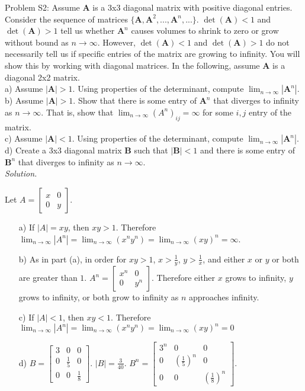 \documentclass[12pt,pdftex]{article}
\begin{document}
\noindent Problem S2: Assume $\mathbf{A}$ is a 3x3 diagonal matrix with positive diagonal entries.\\
Consider the sequence of matrices $\{\mathbf{A}, \mathbf{A}^2,...,\mathbf{A}^n,...\}$.  $\det(\mathbf{A})<1$ and $\det(\mathbf{A})>1$ tell us whether $\mathbf{A}^n$ causes volumes to shrink to zero or grow without bound as $n\rightarrow \infty$.  However, $\det(\mathbf{A})<1$ and $\det(\mathbf{A})>1$ do not necessarily tell us if specific entries of the matrix are growing to infinity.  You will show this by working with diagonal matrices. In the following, assume $\mathbf{A}$ is a diagonal 2x2 matrix.  \\
a) Assume $|\mathbf{A}|>1$.  Using properties of the determinant, compute $\lim_{n\rightarrow\infty}|\mathbf{A}^n|$. \\
b)   Assume $|\mathbf{A}|>1$. Show that there is some entry of $\mathbf{A}^n$ that diverges to infinity as $n\rightarrow\infty$.  That is, show that $\lim_{n\rightarrow \infty} (A^n)_{ij}=\infty$ for some $i,j$ entry of the matrix. \\
c) Assume $|\mathbf{A}|<1$.  Using properties of the determinant, compute $\lim_{n\rightarrow\infty}|\mathbf{A}^n|$. \\
d) Create a 3x3 diagonal matrix $\mathbf{B}$ such that $|\mathbf{B}|<1$ and there is some entry of $\mathbf{B}^n$ that diverges to infinity as $n\rightarrow\infty$.   \\
\textit{Solution.}\\
\begin{center}Let $A=\begin{bmatrix} x & 0 \\ 0 & y\end{bmatrix}$.\end{center}
\begin{itemize}
\item[a)] If $|A|=xy$, then $xy > 1$. Therefore $\lim_{n\rightarrow\infty}|A^n|=\lim_{n\rightarrow\infty}(x^ny^n)=\lim_{n\rightarrow\infty}(xy)^n=\infty$.
\item[b)] As in part (a), in order for $xy>1$, $x>\frac{1}{y}$, $y>\frac{1}{x}$, and either $x$ or $y$ or both are greater than $1$. 
$A^n=\begin{bmatrix}x^n & 0 \\ 0 & y^n\end{bmatrix}$. Therefore either $x$ grows to infinity, $y$ grows to infinity, or both grow to infinity as $n$ approaches infinity.
\item[c)] If $|A|<1$, then $xy<1$. Therefore $\lim_{n\rightarrow\infty}|A^n|=\lim_{n\rightarrow\infty}(x^ny^n)=\lim_{n\rightarrow\infty}(xy)^n=0$
\item[d)] $B=\begin{bmatrix}3&0&0\\0&\frac{1}{5}&0\\0&0&\frac{1}{8}\end{bmatrix}$. $|B|=\frac{3}{40}$. 
$B^n=\begin{bmatrix}3^n & 0 & 0\\0&(\frac{1}{5})^n&0\\0&0&(\frac{1}{8})^n\end{bmatrix}$.
\end{itemize}
\end{document}
